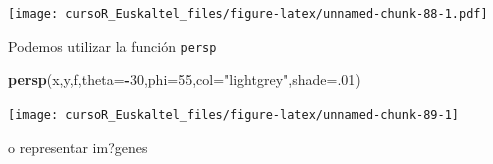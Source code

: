 \documentclass[]{book}
\newenvironment{Shaded}{\begin{snugshade}}{\end{snugshade}}
\newcommand{\KeywordTok}[1]{\textcolor[rgb]{0.13,0.29,0.53}{\textbf{#1}}}
\newcommand{\DataTypeTok}[1]{\textcolor[rgb]{0.13,0.29,0.53}{#1}}
\newcommand{\DecValTok}[1]{\textcolor[rgb]{0.00,0.00,0.81}{#1}}
\newcommand{\StringTok}[1]{\textcolor[rgb]{0.31,0.60,0.02}{#1}}
\newcommand{\OtherTok}[1]{\textcolor[rgb]{0.56,0.35,0.01}{#1}}
\newcommand{\OperatorTok}[1]{\textcolor[rgb]{0.81,0.36,0.00}{\textbf{#1}}}
\newcommand{\NormalTok}[1]{#1}
\begin{document}
\begin{Shaded}
\end{Shaded}

\texttt{[image: cursoR\_Euskaltel\_files/figure-latex/unnamed-chunk-88-1.pdf]}

Podemos utilizar la función \texttt{persp}

\begin{Shaded}
\begin{Highlighting}[]
\KeywordTok{persp}\NormalTok{(x,y,f,}\DataTypeTok{theta=}\OperatorTok{-}\DecValTok{30}\NormalTok{,}\DataTypeTok{phi=}\DecValTok{55}\NormalTok{,}\DataTypeTok{col=}\StringTok{"lightgrey"}\NormalTok{,}\DataTypeTok{shade=}\NormalTok{.}\DecValTok{01}\NormalTok{)}
\end{Highlighting}
\end{Shaded}

\begin{center}\texttt{[image: cursoR\_Euskaltel\_files/figure-latex/unnamed-chunk-89-1]} \end{center}

o representar im?genes
\end{document}
